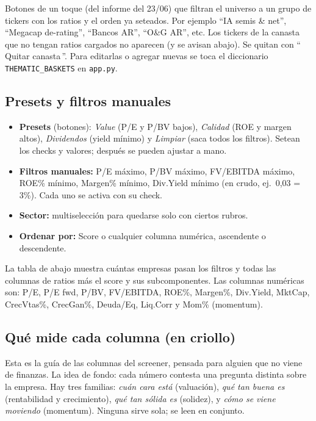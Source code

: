 \documentclass[11pt,a4paper]{article}
\newcommand{\code}[1]{\texttt{#1}}
\newcommand{\fpath}[1]{\texttt{#1}}
\begin{document}
Botones de un toque (del informe del 23/06) que filtran el universo a un grupo de
tickers con los ratios y el orden ya seteados. Por ejemplo ``IA semis \& net'',
``Megacap de-rating'', ``Bancos AR'', ``O\&G AR'', etc. Los tickers de la canasta que
no tengan ratios cargados no aparecen (y se avisan abajo). Se quitan con
``\,Quitar canasta\,''. Para editarlas o agregar nuevas se toca el diccionario
\code{THEMATIC\_BASKETS} en \fpath{app.py}.

\subsection{Presets y filtros manuales}

\begin{itemize}[leftmargin=1.4em]
  \item \textbf{Presets} (botones): \emph{Value} (P/E y P/BV bajos), \emph{Calidad}
  (ROE y margen altos), \emph{Dividendos} (yield m\'inimo) y \emph{Limpiar} (saca
  todos los filtros). Setean los checks y valores; despu\'es se pueden ajustar a mano.
  \item \textbf{Filtros manuales:} P/E m\'aximo, P/BV m\'aximo, FV/EBITDA m\'aximo,
  ROE\% m\'inimo, Margen\% m\'inimo, Div.Yield m\'inimo (en crudo, ej.\ 0,03 = 3\%).
  Cada uno se activa con su check.
  \item \textbf{Sector:} multiselecci\'on para quedarse solo con ciertos rubros.
  \item \textbf{Ordenar por:} Score o cualquier columna num\'erica, ascendente o
  descendente.
\end{itemize}

La tabla de abajo muestra cu\'antas empresas pasan los filtros y todas las columnas de
ratios m\'as el score y sus subcomponentes. Las columnas num\'ericas son: P/E, P/E
fwd, P/BV, FV/EBITDA, ROE\%, Margen\%, Div.Yield, MktCap, CrecVtas\%, CrecGan\%,
Deuda/Eq, Liq.Corr y Mom\% (momentum).

\subsection{Qu\'e mide cada columna (en criollo)}

Esta es la gu\'ia de las columnas del screener, pensada para alguien que no viene de
finanzas. La idea de fondo: cada n\'umero contesta una pregunta distinta sobre la
empresa. Hay tres familias: \emph{cu\'an cara est\'a} (valuaci\'on), \emph{qu\'e tan
buena es} (rentabilidad y crecimiento), \emph{qu\'e tan s\'olida es} (solidez), y
\emph{c\'omo se viene moviendo} (momentum). Ninguna sirve sola; se leen en conjunto.
\end{document}
